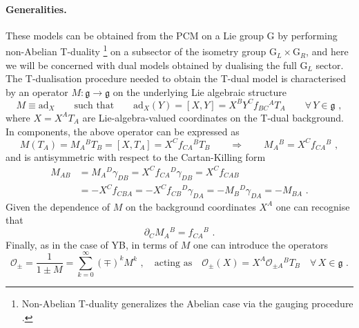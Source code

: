\documentclass[12pt]{article}
\numberwithin{equation}{section}
\begin{document}
\paragraph{Generalities.} These models can be obtained from the PCM on a Lie group G by performing non-Abelian T-duality \cite{Fridling:1983ha,Fradkin:1984ai,delaOssa:1992vci,Alvarez:1993qi}\footnote{Non-Abelian T-duality generalizes the Abelian case \cite{Buscher:1987sk,Buscher:1987qj} via the gauging procedure \cite{Rocek:1991ps}.} on a subsector of the isometry group G$_{L}\times$G$_{R}$, and here we will be concerned with dual models obtained by dualising the full G$_{L}$ sector. The T-dualisation procedure needed to obtain the T-dual model is characterised by an operator $M:\mathfrak{g}\rightarrow\mathfrak{g}$ on the underlying Lie algebraic structure
\begin{equation}
M\equiv \mathrm{ad}_{X} 
\qquad \text{such that} \qquad
\mathrm{ad}_{X}(Y)=[X,Y]=X^{B}Y^{C}f_{BC}{}^{A}T_{A} \qquad \forall \, Y\in \mathfrak{g} \,\, ,
\end{equation}
where $X=X^{A}T_{A}$ are Lie-algebra-valued coordinates on the T-dual background. In components, the above operator can be expressed as
\begin{equation}\label{TD-M-in-components}
M(T_{A})=M_{A}{}^{B}T_{B}=[X,T_{A}]=X^{C}f_{CA}{}^{B}T_{B}  
\qquad \Rightarrow \qquad 
M_{A}{}^{B}=X^{C}f_{CA}{^{B}} \,\, , 
\end{equation}
and is antisymmetric with respect to the Cartan-Killing form
\begin{equation}
\begin{aligned}
M_{AB}&=M_{A}{}^{D}\gamma_{DB}=X^{C}f_{CA}{}^{D}\gamma_{DB}=X^{C}f_{CAB}
\\
&=-X^{C}f_{CBA}=-X^{C}f_{CB}{}^{D}\gamma_{DA}=-M_{B}{}^{D}\gamma_{DA}=-M_{BA} \,\, .
\end{aligned}
\end{equation} 
Given the dependence of $M$ on the background coordinates $X^{A}$ one can recognise that
\begin{equation}\label{TD-M-derivative-components}
\partial_{C}M_{A}{}^{B}=f_{CA}{}^{B} \,\, .
\end{equation}
Finally, as in the case of YB, in terms of $M$ one can introduce the operators
\begin{equation}\label{TD-operators-definition}
\mathcal{O}_{\pm}=\frac{1}{1\pm M}=\sum_{k=0}^{\infty}(\mp)^k
M^k \,\, , 
\quad \text{acting as} \quad \mathcal{O}_{\pm}(X)=X^{A}\mathcal{O}_{\pm A}{}^{B}T_{B} \quad \forall \, X\in \mathfrak{g} \,\, .
\end{equation}
\end{document}
